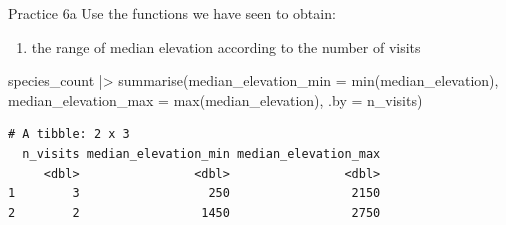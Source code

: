 \documentclass[
  ignorenonframetext,
  aspectratio=169,
  t]{beamer}
\newenvironment{Shaded}{\begin{snugshade}}{\end{snugshade}}
\newcommand{\AttributeTok}[1]{\textcolor[rgb]{0.40,0.45,0.13}{#1}}
\newcommand{\FunctionTok}[1]{\textcolor[rgb]{0.28,0.35,0.67}{#1}}
\newcommand{\NormalTok}[1]{\textcolor[rgb]{0.00,0.23,0.31}{#1}}
\newcommand{\SpecialCharTok}[1]{\textcolor[rgb]{0.37,0.37,0.37}{#1}}
\providecommand{\tightlist}{%
  \setlength{\itemsep}{0pt}\setlength{\parskip}{0pt}}
\begin{document}
\begin{frame}[fragile]{Practice 6a}
\protect{}\label{practice-6a}
Use the functions we have seen to obtain:

\begin{enumerate}
\tightlist
\item
  the range of median elevation according to the number of visits
\end{enumerate}

\footnotesize

\begin{Shaded}
\begin{Highlighting}[]
\NormalTok{species\_count }\SpecialCharTok{|\textgreater{}} 
    \FunctionTok{summarise}\NormalTok{(}\AttributeTok{median\_elevation\_min =} \FunctionTok{min}\NormalTok{(median\_elevation),}
              \AttributeTok{median\_elevation\_max =} \FunctionTok{max}\NormalTok{(median\_elevation),}
              \AttributeTok{.by =}\NormalTok{ n\_visits)}
\end{Highlighting}
\end{Shaded}

\begin{verbatim}
# A tibble: 2 x 3
  n_visits median_elevation_min median_elevation_max
     <dbl>                <dbl>                <dbl>
1        3                  250                 2150
2        2                 1450                 2750
\end{verbatim}

\normalsize
\end{frame}
\end{document}

